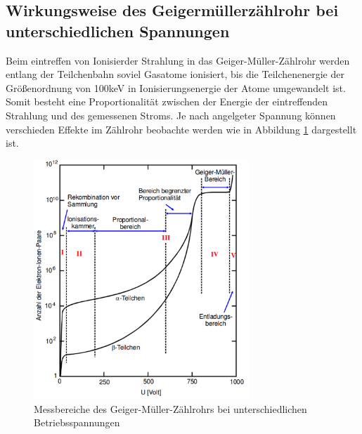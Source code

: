 \subsection{Wirkungsweise des Geigermüllerzählrohr bei unterschiedlichen Spannungen}
Beim eintreffen von Ionisierder Strahlung in das Geiger-Müller-Zählrohr werden entlang der Teilchenbahn soviel Gasatome ionisiert, bis die Teilchenenergie der Größenordnung von 100keV in Ionisierungsenergie der Atome umgewandelt ist. Somit besteht eine Proportionalität zwischen der Energie der eintreffenden Strahlung und des gemessenen Stroms. Je nach angelgeter Spannung können verschieden Effekte im Zählrohr beobachte werden wie in Abbildung \ref{fig:Geb} dargestellt ist.
\begin{figure}
  \centering
  \includegraphics[height=9cm]{picture/Gebiete.pdf}
  \caption{Messbereiche des Geiger-Müller-Zählrohrs bei unterschiedlichen Betriebsspannungen \cite{sample}}
  \label{fig:Geb}
\end{figure}
